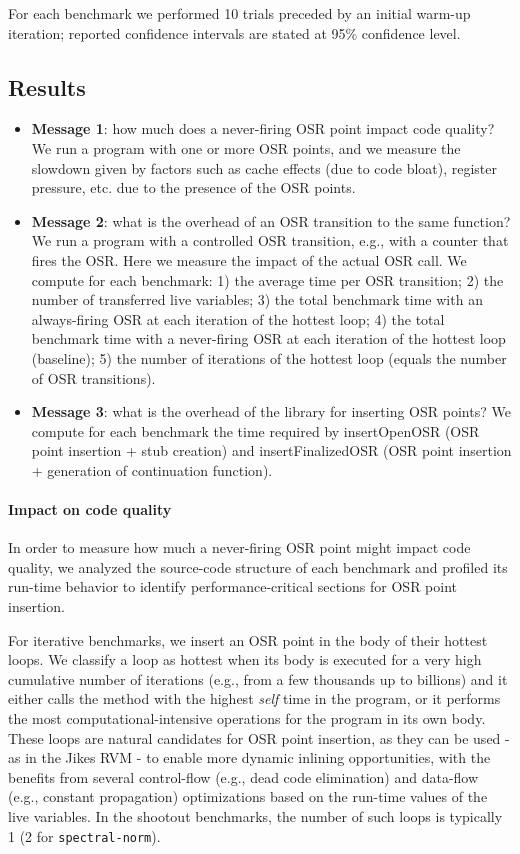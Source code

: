 For each benchmark we performed 10 trials preceded by an initial warm-up iteration; reported confidence intervals are stated at 95\% confidence level.

\subsection{Results}

\begin{itemize}
\item {\bf Message 1}: how much does a never-firing OSR point impact code quality? We run a program with one or more OSR points, and we measure the slowdown given by factors such as cache effects (due to code bloat), register pressure, etc. due to the presence of the OSR points.
\item {\bf Message 2}: what is the overhead of an OSR transition to the same function? We run a program with a controlled OSR transition, e.g., with a counter that fires the OSR. Here we measure the impact of the actual OSR call. We compute for each benchmark: 1) the average time per OSR transition; 2) the number of transferred live variables; 3) the total benchmark time with an always-firing OSR at each iteration of the hottest loop; 4) the total benchmark time with a never-firing OSR at each iteration of the hottest loop (baseline); 5) the number of iterations of the hottest loop (equals the number of OSR transitions).
\item {\bf Message 3}: what is the overhead of the library for inserting OSR points? We compute for each benchmark the time required by insertOpenOSR (OSR point insertion + stub creation) and insertFinalizedOSR (OSR point insertion + generation of continuation function).
\end{itemize}

\paragraph{Impact on code quality}
In order to measure how much a never-firing OSR point might impact code quality, we analyzed the source-code structure of each benchmark and profiled its run-time behavior to identify performance-critical sections for OSR point insertion.

For iterative benchmarks, we insert an OSR point in the body of their hottest loops. We classify a loop as hottest when its body is executed for a very high cumulative number of iterations (e.g., from a few thousands up to billions) and it either calls the method with the highest {\em self} time in the program, or it performs the most computational-intensive operations for the program in its own body. These loops are natural candidates for OSR point insertion, as they can be used - as in the Jikes RVM - to enable more dynamic inlining opportunities, with the benefits from several control-flow (e.g., dead code elimination) and data-flow (e.g., constant propagation) optimizations based on the run-time values of the live variables. In the shootout benchmarks, the number of such loops is typically 1 (2 for {\tt spectral-norm}).

